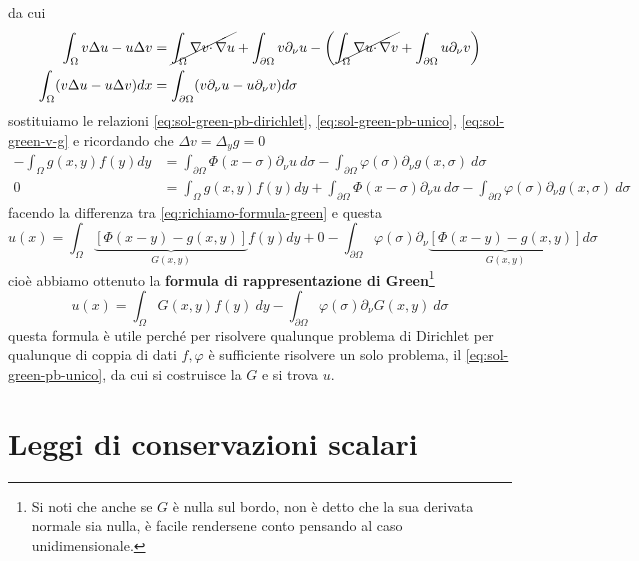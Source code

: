 \documentclass[10pt,a4paper,twoside,openright]{book}
\begin{document}
da cui
\begin{align*}
	\int _{\Omega } v\Delta u-u\Delta v      & =\cancel{\int _{\Omega } \nabla v\cdotp \nabla u} +\int _{\partial \Omega } v\partial _{\nu } u-\left(\cancel{\int _{\Omega } \nabla u\cdotp \nabla v} +\int _{\partial \Omega } u\partial _{\nu } v\right) \\
	\int _{\Omega }( v\Delta u-u\Delta v) dx & =\int _{\partial \Omega }( v\partial _{\nu } u-u\partial _{\nu } v) d\sigma                                                                                                                                 
\end{align*}
sostituiamo le relazioni \eqref{eq:sol-green-pb-dirichlet}, \eqref{eq:sol-green-pb-unico}, \eqref{eq:sol-green-v-g} e ricordando che $\Delta v=\Delta _{y} g=0$
\begin{align*}
	-\int _{\Omega } g( x,y) f( y) dy & =\int _{\partial \Omega } \Phi ( x-\sigma ) \partial _{\nu } u\ d\sigma -\int _{\partial \Omega } \varphi ( \sigma ) \partial _{\nu } g( x,\sigma ) \ d\sigma                                  \\
	0                                 & =\int _{\Omega } g( x,y) f( y) dy+\int _{\partial \Omega } \Phi ( x-\sigma ) \partial _{\nu } u\ d\sigma -\int _{\partial \Omega } \varphi ( \sigma ) \partial _{\nu } g( x,\sigma ) \ d\sigma 
\end{align*}
facendo la differenza tra \eqref{eq:richiamo-formula-green} e questa
\begin{equation*}
	u( x) =\int _{\Omega }\underbrace{[ \Phi ( x-y) -g( x,y)]}_{G( x,y)} f( y) dy+0-\int _{\partial \Omega } \varphi ( \sigma ) \partial _{\nu }\underbrace{[ \Phi ( x-y) -g( x,y)]}_{G( x,y)} d\sigma 
\end{equation*}
cioè abbiamo ottenuto la \textbf{formula di rappresentazione di Green}\footnote{Si noti che anche se $G$ è nulla sul bordo, non è detto che la sua derivata normale sia nulla, è facile rendersene conto pensando al caso unidimensionale.}
\begin{equation*}
	\boxed{u( x) =\int _{\Omega } G( x,y) f( y) \ dy-\int _{\partial \Omega } \varphi ( \sigma ) \partial _{\nu } G( x,y) \ d\sigma }
\end{equation*}
questa formula è utile perché per risolvere qualunque problema di Dirichlet per qualunque di coppia di dati $f,\varphi $ è sufficiente risolvere un solo problema, il \eqref{eq:sol-green-pb-unico}, da cui si costruisce la $G$ e si trova $u$.
\chapter{Leggi di conservazioni scalari}
\end{document}
